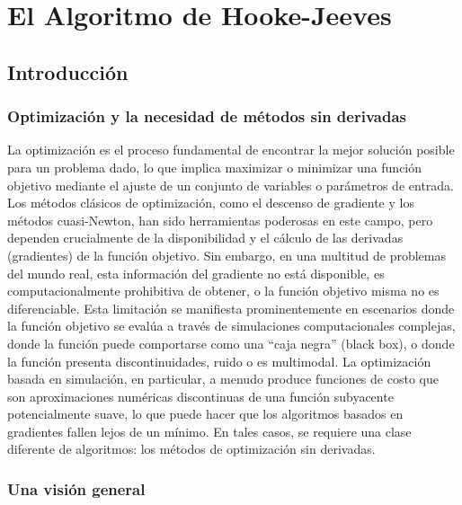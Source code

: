 \chapter{El Algoritmo de Hooke-Jeeves}

\section{Introducción}

\subsection{Optimización y la necesidad de métodos sin derivadas}

La optimización es el proceso fundamental de encontrar la mejor solución posible para un problema dado, lo que implica maximizar o minimizar una función objetivo mediante el ajuste de un conjunto de variables o parámetros de entrada. Los métodos clásicos de optimización, como el descenso de gradiente y los métodos cuasi-Newton, han sido herramientas poderosas en este campo, pero dependen crucialmente de la disponibilidad y el cálculo de las derivadas (gradientes) de la función objetivo. Sin embargo, en una multitud de problemas del mundo real, esta información del gradiente no está disponible, es computacionalmente prohibitiva de obtener, o la función objetivo misma no es diferenciable. Esta limitación se manifiesta prominentemente en escenarios donde la función objetivo se evalúa a través de simulaciones computacionales complejas, donde la función puede comportarse como una “caja negra” (black box), o donde la función presenta discontinuidades, ruido o es multimodal. La optimización basada en simulación, en particular, a menudo produce funciones de costo que son aproximaciones numéricas discontinuas de una función subyacente potencialmente suave, lo que puede hacer que los algoritmos basados en gradientes fallen lejos de un mínimo. En tales casos, se requiere una clase diferente de algoritmos: los métodos de optimización sin derivadas.

\subsection{Una visión general}

